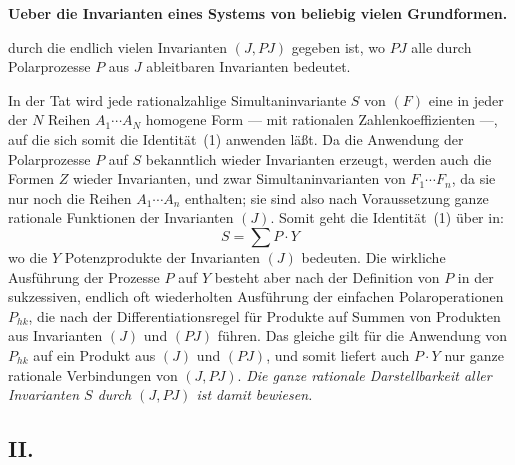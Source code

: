 \documentclass[12pt,a4paper]{article}
\begin{document}
\renewenvironment{noetherpaper}[4]{\newpage\section*{#1}\addcontentsline{toc}{section}{#1}\par\smallskip}{\par\medskip}



\begin{center}
\textbf{Ueber die Invarianten eines Systems von beliebig vielen Grundformen.}
\end{center}

\noindent durch die endlich vielen Invarianten $(J, PJ)$ gegeben ist, wo $PJ$ alle durch Polarprozesse $P$ aus $J$ ableitbaren Invarianten bedeutet.

In der Tat wird jede rationalzahlige Simultaninvariante $S$ von $(F)$ eine in jeder der $N$ Reihen $A_1 \cdots A_N$ homogene Form --- mit rationalen Zahlenkoeffizienten ---, auf die sich somit die Identit\"at~(1) anwenden l\"a\ss t. Da die Anwendung der Polarprozesse $P$ auf $S$ bekanntlich wieder Invarianten erzeugt, werden auch die Formen $Z$ wieder Invarianten, und zwar Simultaninvarianten von $F_1 \cdots F_n$, da sie nur noch die Reihen $A_1 \cdots A_n$ enthalten; sie sind also nach Voraussetzung ganze rationale Funktionen der Invarianten $(J)$. Somit geht die Identit\"at~(1) \"uber in:
\[
S = \sum P \cdot Y
\]
wo die $Y$ Potenzprodukte der Invarianten $(J)$ bedeuten. Die wirkliche Ausf\"uhrung der Prozesse $P$ auf $Y$ besteht aber nach der Definition von $P$ in der sukzessiven, endlich oft wiederholten Ausf\"uhrung der einfachen Polaroperationen $P_{hk}$, die nach der Differentiationsregel f\"ur Produkte auf Summen von Produkten aus Invarianten $(J)$ und $(PJ)$ f\"uhren. Das gleiche gilt f\"ur die Anwendung von $P_{hk}$ auf ein Produkt aus $(J)$ und $(PJ)$, und somit liefert auch $P \cdot Y$ nur ganze rationale Verbindungen von $(J, PJ)$. \emph{Die ganze rationale Darstellbarkeit aller Invarianten $S$ durch $(J, PJ)$ ist damit bewiesen.}

\subsection*{II.}
\end{document}
